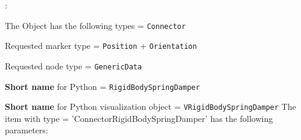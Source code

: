 \noindent {}:
\bi
  \item The Object has the following types = \texttt{Connector}
  \item Requested marker type = \texttt{Position} + \texttt{Orientation}
  \item Requested node type = \texttt{GenericData}
  \item {\bf Short name} for Python = \texttt{RigidBodySpringDamper}
  \item {\bf Short name} for Python visualization object = \texttt{VRigidBodySpringDamper}
\ei\vspace{12pt} \noindent 
The item  with type = 'ConnectorRigidBodySpringDamper' has the following parameters:
\vspace{-0.5cm}\\
\vspace{-0.5cm}\\

